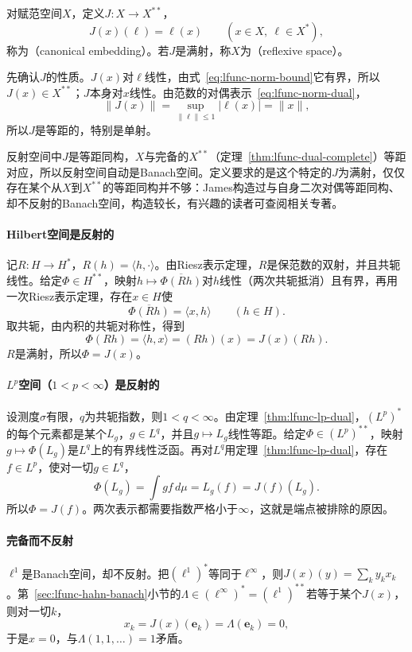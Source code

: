 \begin{definition}[自然嵌入与反射空间]
\label{def:lfunc-reflexive}
对赋范空间$X$，定义$J:X\to X^{**}$，
\begin{equation}
J(x)(\ell)=\ell(x)\qquad(x\in X,\ \ell\in X^*),
\label{eq:lfunc-canonical-embedding}
\end{equation}
称为（canonical embedding）。若$J$是满射，称$X$为（reflexive space）。
\end{definition}

先确认$J$的性质。$J(x)$对$\ell$线性，由式~\eqref{eq:lfunc-norm-bound}它有界，所以$J(x)\in X^{**}$；$J$本身对$x$线性。由范数的对偶表示~\eqref{eq:lfunc-norm-dual}，
\[
\lVert J(x)\rVert=\sup_{\lVert\ell\rVert\leq1}\lvert\ell(x)\rvert=\lVert x\rVert ,
\]
所以$J$是等距的，特别是单射。

反射空间中$J$是等距同构，$X$与完备的$X^{**}$（定理~\ref{thm:lfunc-dual-complete}）等距对应，所以反射空间自动是Banach空间。定义要求的是这个特定的$J$为满射，仅仅存在某个从$X$到$X^{**}$的等距同构并不够：James构造过与自身二次对偶等距同构、却不反射的Banach空间，构造较长，有兴趣的读者可查阅相关专著。

\paragraph{Hilbert空间是反射的}
记$R:H\to H^*$，$R(h)=\langle h,\cdot\rangle$。由Riesz表示定理，$R$是保范数的双射，并且共轭线性。给定$\Phi\in H^{**}$，映射$h\mapsto\overline{\Phi(Rh)}$对$h$线性（两次共轭抵消）且有界，再用一次Riesz表示定理，存在$x\in H$使
\[
\overline{\Phi(Rh)}=\langle x,h\rangle\qquad(h\in H).
\]
取共轭，由内积的共轭对称性，得到
\[
\Phi(Rh)=\langle h,x\rangle=(Rh)(x)=J(x)(Rh).
\]
$R$是满射，所以$\Phi=J(x)$。

\paragraph{\texorpdfstring{$L^p$}{Lp}空间（\texorpdfstring{$1<p<\infty$}{1<p<infinity}）是反射的}
设测度$\sigma$有限，$q$为共轭指数，则$1<q<\infty$。由定理~\ref{thm:lfunc-lp-dual}，$(L^p)^*$的每个元素都是某个$L_g$，$g\in L^q$，并且$g\mapsto L_g$线性等距。给定$\Phi\in(L^p)^{**}$，映射$g\mapsto\Phi(L_g)$是$L^q$上的有界线性泛函。再对$L^q$用定理~\ref{thm:lfunc-lp-dual}，存在$f\in L^p$，使对一切$g\in L^q$，
\[
\Phi(L_g)=\int gf\,d\mu=L_g(f)=J(f)(L_g).
\]
所以$\Phi=J(f)$。两次表示都需要指数严格小于$\infty$，这就是端点被排除的原因。

\paragraph{完备而不反射}
$\ell^1$是Banach空间，却不反射。把$(\ell^1)^*$等同于$\ell^\infty$，则$J(x)(y)=\sum_ky_kx_k$。第~\ref{sec:lfunc-hahn-banach}小节的$\Lambda\in(\ell^\infty)^*=(\ell^1)^{**}$若等于某个$J(x)$，则对一切$k$，
\[
x_k=J(x)(\bm e_k)=\Lambda(\bm e_k)=0 ,
\]
于是$x=0$，与$\Lambda(1,1,\ldots)=1$矛盾。

